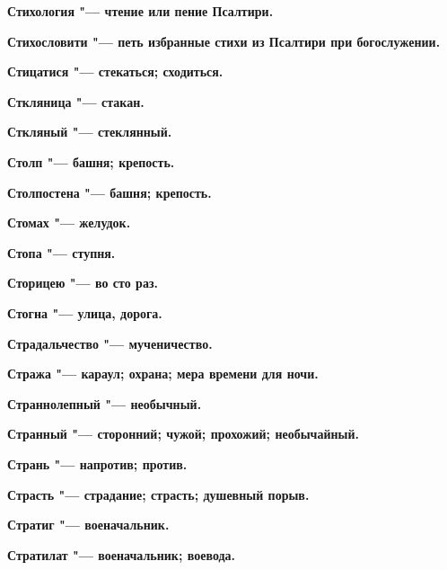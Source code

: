 \begin{mymulticols}{2}
\bfseries Стихология\normalfont{} "--- чтение или пение Псалтири. 




\bfseries Стихословити\normalfont{} "--- петь избранные стихи из Псалтири при богослужении. 




\bfseries Стицатися\normalfont{} "--- стекаться; сходиться. 




\bfseries Сткляница\normalfont{} "--- стакан. 




\bfseries Сткляный\normalfont{} "--- стеклянный. 




\bfseries Столп\normalfont{} "--- башня; крепость. 




\bfseries Столпостена\normalfont{} "--- башня; крепость. 




\bfseries Стомах\normalfont{} "--- желудок. 




\bfseries Стопа\normalfont{} "--- ступня. 




\bfseries Сторицею\normalfont{} "--- во сто раз. 




\bfseries Стогна\normalfont{} "--- улица, дорога. 




\bfseries Страдальчество\normalfont{} "--- мученичество. 




\bfseries Стража\normalfont{} "--- караул; охрана; мера времени для ночи. 




\bfseries Страннолепный\normalfont{} "--- необычный. 




\bfseries Странный\normalfont{} "--- сторонний; чужой; прохожий; необычайный. 




\bfseries Странь\normalfont{} "--- напротив; против. 




\bfseries Страсть\normalfont{} "--- страдание; страсть; душевный порыв. 




\bfseries Стратиг\normalfont{} "--- военачальник. 




\bfseries Стратилат\normalfont{} "--- военачальник; воевода. 





\end{mymulticols}
